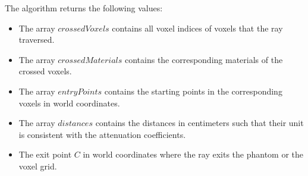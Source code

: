 The algorithm returns the following values:

\begin{itemize}
    \item The array $crossedVoxels$ contains all voxel indices of voxels that the ray traversed.
    \item The array $crossedMaterials$ contains the corresponding materials of the crossed voxels.
    \item The array $entryPoints$ contains the starting points in the corresponding voxels in world coordinates.
    \item The array $distances$ contains the distances in centimeters such that their unit is consistent with the attenuation coefficients.
    \item The exit point $C$ in world coordinates where the ray exits the phantom or the voxel grid.
\end{itemize}

